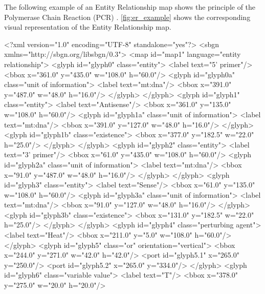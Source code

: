 The following example of an Entity Relationship map shows the principle of the Polymerase Chain Reaction (PCR) \citep{Mullis1986}. \ref{fig:er_example} shows the corresponding visual representation of the Entity Relationship map.

\begin{example}
<?xml version="1.0" encoding="UTF-8" standalone="yes"?>
<sbgn xmlns="http://sbgn.org/libsbgn/0.3">
    <map id="map1" language="entity relationship">
        <glyph id="glyph0" class="entity">
            <label text="5' primer"/>
            <bbox x="361.0" y="435.0" w="108.0" h="60.0"/>
            <glyph id="glyph0a" class="unit of information">
                <label text="mt:dna"/>
                <bbox x="391.0" y="487.0" w="48.0" h="16.0"/>
            </glyph>
        </glyph>
        <glyph id="glyph1" class="entity">
            <label text="Antisense"/>
            <bbox x="361.0" y="135.0" w="108.0" h="60.0"/>
            <glyph id="glyph1a" class="unit of information">
                <label text="mt:dna"/>
                <bbox x="391.0" y="127.0" w="48.0" h="16.0"/>
            </glyph>
            <glyph id="glyph1b" class="existence">
                <bbox x="377.0" y="182.5" w="22.0" h="25.0"/>
            </glyph>
        </glyph>
        <glyph id="glyph2" class="entity">
            <label text="3' primer"/>
            <bbox x="61.0" y="435.0" w="108.0" h="60.0"/>
            <glyph id="glyph2a" class="unit of information">
                <label text="mt:dna"/>
                <bbox x="91.0" y="487.0" w="48.0" h="16.0"/>
            </glyph>
        </glyph>
        <glyph id="glyph3" class="entity">
            <label text="Sense"/>
            <bbox x="61.0" y="135.0" w="108.0" h="60.0"/>
            <glyph id="glyph3a" class="unit of information">
                <label text="mt:dna"/>
                <bbox x="91.0" y="127.0" w="48.0" h="16.0"/>
            </glyph>
            <glyph id="glyph3b" class="existence">
                <bbox x="131.0" y="182.5" w="22.0" h="25.0"/>
            </glyph>
        </glyph>
        <glyph id="glyph4" class="perturbing agent">
            <label text="Heat"/>
            <bbox x="211.0" y="5.0" w="108.0" h="60.0"/>
        </glyph>
        <glyph id="glyph5" class="or" orientation="vertical">
            <bbox x="244.0" y="271.0" w="42.0" h="42.0"/>
            <port id="glyph5.1" x="265.0" y="250.0"/>
            <port id="glyph5.2" x="265.0" y="334.0"/>
        </glyph>
        <glyph id="glyph6" class="variable value">
            <label text="T"/>
            <bbox x="378.0" y="275.0" w="20.0" h="20.0"/>

\end{example}
